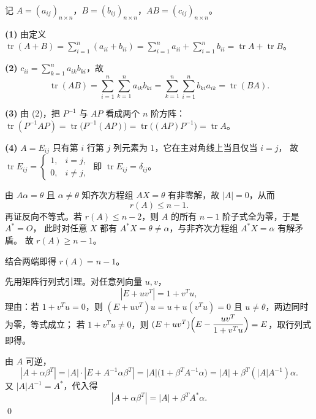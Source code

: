 \begin{solution}
记 $A=(a_{ij})_{n\times n}$，$B=(b_{ij})_{n\times n}$，$AB=(c_{ij})_{n\times n}$。

\textbf{(1)} 由定义 $\operatorname{tr}(A+B)=\sum_{i=1}^{n}(a_{ii}+b_{ii})=\sum_{i=1}^{n}a_{ii}+\sum_{i=1}^{n}b_{ii}=\operatorname{tr}A+\operatorname{tr}B$。

\textbf{(2)} $c_{ii}=\sum_{k=1}^{n}a_{ik}b_{ki}$，故
\[
\operatorname{tr}(AB)=\sum_{i=1}^{n}\sum_{k=1}^{n}a_{ik}b_{ki}
=\sum_{k=1}^{n}\sum_{i=1}^{n}b_{ki}a_{ik}=\operatorname{tr}(BA).
\]

\textbf{(3)} 由 (2)，把 $P^{-1}$ 与 $AP$ 看成两个 $n$ 阶方阵：
$\operatorname{tr}(P^{-1}AP)=\operatorname{tr}\bigl(P^{-1}(AP)\bigr)=\operatorname{tr}\bigl((AP)P^{-1}\bigr)=\operatorname{tr}A$。

\textbf{(4)} $A=E_{ij}$ 只有第 $i$ 行第 $j$ 列元素为 $1$，它在主对角线上当且仅当 $i=j$，
故 $\operatorname{tr}E_{ij}=\begin{cases}1,&i=j,\\0,&i\ne j,\end{cases}$ 即 $\operatorname{tr}E_{ij}=\delta_{ij}$。
\end{solution}

\begin{solution}
由 $A\alpha=\theta$ 且 $\alpha\ne\theta$ 知齐次方程组 $AX=\theta$ 有非零解，故 $|A|=0$，从而
\[
r(A)\le n-1 .
\]
再证反向不等式。若 $r(A)\le n-2$，则 $A$ 的所有 $n-1$ 阶子式全为零，于是 $A^{*}=O$，
此时对任意 $X$ 都有 $A^{*}X=\theta\ne\alpha$，与非齐次方程组 $A^{*}X=\alpha$ 有解矛盾。
故 $r(A)\ge n-1$。

结合两端即得 $r(A)=n-1$。
\end{solution}

\begin{solution}
先用矩阵行列式引理。对任意列向量 $u,v$，
\[
|E+uv^{T}|=1+v^{T}u ,
\]
理由：若 $1+v^{T}u=0$，则 $(E+uv^{T})u=u+u(v^{T}u)=0$ 且 $u\ne\theta$，两边同时为零，等式成立；
若 $1+v^{T}u\ne0$，则
$(E+uv^{T})\Bigl(E-\dfrac{uv^{T}}{1+v^{T}u}\Bigr)=E$，取行列式即得。

由 $A$ 可逆，
\[
|A+\alpha\beta^{T}|=|A|\cdot|E+A^{-1}\alpha\beta^{T}|
=|A|\bigl(1+\beta^{T}A^{-1}\alpha\bigr)=|A|+\beta^{T}(|A|A^{-1})\alpha .
\]
又 $|A|A^{-1}=A^{*}$，代入得
\[
|A+\alpha\beta^{T}|=|A|+\beta^{T}A^{*}\alpha .
\]
\qed
\end{solution}
